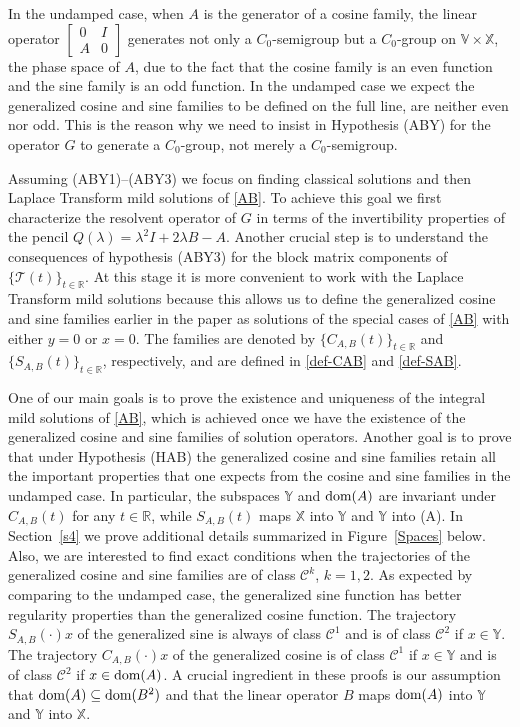 \documentclass[11pt]{amsart}
\numberwithin{equation}{section}
\newcommand{\SAB}{S_{A,B}}
\newcommand{\CAB}{C_{A,B}}
\newcommand{\RR}{{\mathbb R}}
\theoremstyle{remark}
\theoremstyle{definition}
\newcommand\cT{{\mathcal T}}
\newcommand\bV{{\mathbb V}}
\newcommand\bX{{\mathbb X}}
\newcommand\bY{{\mathbb Y}}
\newcommand{\dom}{\text{\rm{dom}}}
\begin{document}
In the undamped case, when $A$ is the generator of a cosine family, the linear operator $\left[\begin{smallmatrix} 0 & I \\ A & 0 \end{smallmatrix}\right]$ generates not only a $C_0$-semigroup but a $C_0$-group on $\bV\times\bX$, the phase space of $A$, due to the fact that the cosine family is an even function and the sine family is an odd function. In the undamped case we expect the  
generalized cosine and sine families to be defined on the full line, are neither even nor odd. This is the reason why we need  to insist in Hypothesis (ABY) for the operator $G$ to generate a $C_0$-group, not merely a $C_0$-semigroup.

Assuming \textnormal{(ABY1)--(ABY3)} we focus on finding classical solutions and then Laplace Transform mild solutions of \eqref{AB}. To achieve this goal we first characterize the resolvent operator of $G$ in terms of the invertibility properties of the pencil $Q(\lambda)=\lambda^2 I+2\lambda B-A$. Another crucial step is to understand the consequences of hypothesis (ABY3) for the block matrix components of $\{\cT(t)\}_{t\in\RR}$. At this stage it is more convenient to work with the Laplace Transform mild solutions because this allows us to define the generalized cosine and sine families earlier in the paper as solutions of the special cases of \eqref{AB} with either $y=0$ or $x=0$. The families are denoted by $\{\CAB(t)\}_{t\in\RR}$ and $\{\SAB(t)\}_{t\in\RR}$, respectively, and are defined in \eqref{def-CAB} and \eqref{def-SAB}. 

One of our main goals is to prove the existence and uniqueness of the integral mild solutions of \eqref{AB}, which is achieved once we have the existence of the generalized cosine and sine families of solution operators.
Another goal is to prove that under Hypothesis (HAB) the generalized cosine and sine families retain all the important properties that one expects from the cosine and sine families in the undamped case.  In particular, the subspaces $\bY$ and $\dom(A)$ are invariant under $\CAB(t)$ for any $t\in\RR$, while $\SAB(t)$ maps $\bX$ into $\bY$ and $\bY$ into \dom(A). In Section~\ref{s4} we prove additional details summarized in Figure~\ref{Spaces} below. Also, we are interested to find exact conditions when the trajectories of the generalized cosine and sine families are of class $\mathcal{C}^k$, $k=1,2$. As expected by comparing to the undamped case, the generalized sine function has better regularity properties than the generalized cosine function. The trajectory $\SAB(\cdot)x$ of the generalized sine is always of class $\mathcal{C}^1$ and is of class $\mathcal{C}^2$ if $x\in\bY$. The trajectory $\CAB(\cdot)x$ of the generalized cosine is of class $\mathcal{C}^1$ if $x\in\bY$ and is of class $\mathcal{C}^2$ if $x\in\dom(A)$. A crucial ingredient in these proofs is our assumption that $\dom(A)\subseteq\dom(B^2)$ and that the linear operator $B$ maps $\dom(A)$ into $\bY$ and $\bY$ into $\bX$. 
\end{document}

